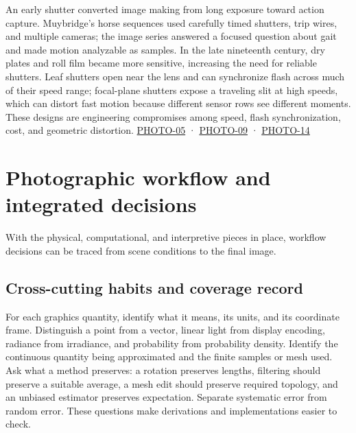 An early shutter converted image making from long exposure toward action capture. Muybridge's horse sequences used carefully timed shutters, trip wires, and multiple cameras; the image series answered a focused question about gait and made motion analyzable as samples. In the late nineteenth century, dry plates and roll film became more sensitive, increasing the need for reliable shutters. Leaf shutters open near the lens and can synchronize flash across much of their speed range; focal-plane shutters expose a traveling slit at high speeds, which can distort fast motion because different sensor rows see different moments. These designs are engineering compromises among speed, flash synchronization, cost, and geometric distortion. \hyperref[04-visual-computing-ii-ch036-photo-05---photography-session-05]{PHOTO-05} · \hyperref[04-visual-computing-ii-ch036-photo-09---photography-session-09]{PHOTO-09} · \hyperref[04-visual-computing-ii-ch036-photo-14---photography-session-14]{PHOTO-14}

\section{Photographic workflow and integrated decisions}\label{04-visual-computing-ii-ch034-photographic-workflow-and-integrated-decisions}

\hypertarget{04-visual-computing-ii-ch034-photographic-workflow-and-integrated-decisions}{}

With the physical, computational, and interpretive pieces in place, workflow decisions can be traced from scene conditions to the final image.

\subsection{Cross-cutting habits and coverage record}\label{04-visual-computing-ii-ch034-cross-cutting-habits-and-coverage-record}

\hypertarget{04-visual-computing-ii-ch034-cross-cutting-habits-and-coverage-record}{}

For each graphics quantity, identify what it means, its units, and its coordinate frame. Distinguish a point from a vector, linear light from display encoding, radiance from irradiance, and probability from probability density. Identify the continuous quantity being approximated and the finite samples or mesh used. Ask what a method preserves: a rotation preserves lengths, filtering should preserve a suitable average, a mesh edit should preserve required topology, and an unbiased estimator preserves expectation. Separate systematic error from random error. These questions make derivations and implementations easier to check.

